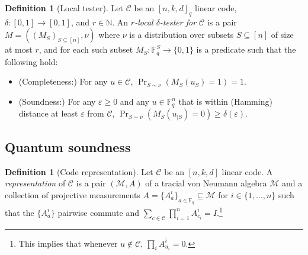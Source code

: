 \documentclass[11pt]{article}
\theoremstyle{definition}
\newtheorem{definition}[theorem]{Definition}
\newcommand{\code}{\mathcal{C}}
\newcommand{\Id}{\ensuremath{I}}
\newcommand{\field}{\mathbb{F}_2}
\newcommand{\N}{\ensuremath{\mathbb{N}}}
\newcommand{\F}{\ensuremath{\mathbb{F}}}
\newcommand{\mM}{\ensuremath{\mathcal{M}}}
\newcommand{\eps}{\varepsilon}
\begin{document}
\begin{definition}[Local tester]\label{def:code-test}
Let $\code$ be an $[n,k,d]_q$ linear code, $\delta:[0,1]\to[0,1]$, and $r\in \N$.
An \emph{$r$-local $\delta$-tester for $\code$} is a pair $M = ((M_S)_{S \subseteq [n]},\nu)$ where $\nu$ is a distribution over subsets $S\subseteq [n]$ of size at most $r$, and for each such subset $M_S:\F_q^S\to\{0,1\}$ is a predicate such that the following hold:
\begin{itemize} 
\item (Completeness:) For any $u\in \code$, $\Pr_{S\sim \nu}( M_S(u_S)=1)=1$.
\item (Soundness:) For any $\eps\geq 0$ and any $u\in \F_q^n$ that is within (Hamming) distance at least  $\eps$ from $\code$, $\Pr_{S\sim\nu}(M_S(u_{|S})=0)\geq \delta(\eps)$.  
\end{itemize}
\end{definition}


\subsection{Quantum soundness}
\label{sec:q-soundness}

\begin{definition}[Code representation]
Let $\code$ be an $[n,k,d]$ linear code. A \emph{representation} of $\code$ is a pair $(\mM,A)$ of a tracial von Neumann algebra $\mM$ and a collection of projective measurements $A = \{A^i_a\}_{a\in\F_q} \subseteq\mM$ for $i\in\{1,\ldots,n\}$ such that the $\{A^i_a\}$ pairwise commute and $\sum_{c\in\code} \prod_{i=1}^n A^i_{c_i}=\Id$.\footnote{This implies that whenever $u\notin \code$, $\prod_i A^i_{u_i}=0$.} 
\end{definition}
\end{document}
